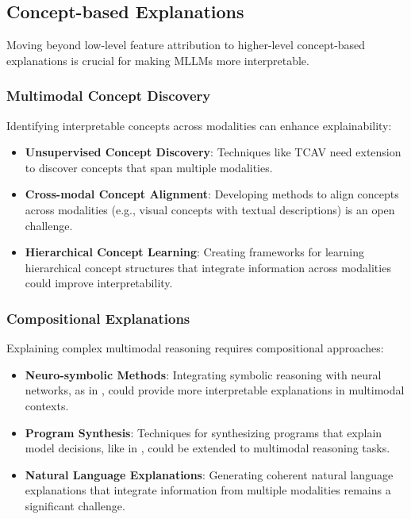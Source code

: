 \subsection{Concept-based Explanations}
Moving beyond low-level feature attribution to higher-level concept-based explanations is crucial for making MLLMs more interpretable.

\subsubsection{Multimodal Concept Discovery}
Identifying interpretable concepts across modalities can enhance explainability:

\begin{itemize}
    \item \textbf{Unsupervised Concept Discovery}: Techniques like TCAV \citep{kim2018interpretability} need extension to discover concepts that span multiple modalities.
    
    \item \textbf{Cross-modal Concept Alignment}: Developing methods to align concepts across modalities (e.g., visual concepts with textual descriptions) is an open challenge.
    
    \item \textbf{Hierarchical Concept Learning}: Creating frameworks for learning hierarchical concept structures that integrate information across modalities could improve interpretability.
\end{itemize}

\subsubsection{Compositional Explanations}
Explaining complex multimodal reasoning requires compositional approaches:

\begin{itemize}
    \item \textbf{Neuro-symbolic Methods}: Integrating symbolic reasoning with neural networks, as in \citep{mao2019neuro}, could provide more interpretable explanations in multimodal contexts.
    
    \item \textbf{Program Synthesis}: Techniques for synthesizing programs that explain model decisions, like in \citep{ellis2018learning}, could be extended to multimodal reasoning tasks.
    
    \item \textbf{Natural Language Explanations}: Generating coherent natural language explanations that integrate information from multiple modalities remains a significant challenge.
\end{itemize}

